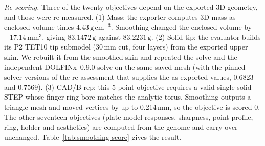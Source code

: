 \begin{table}[t]
\centering\small
\caption{Before and after smoothing, from the smoothing run's machine-readable record.}
\label{tab:smoothing}
\end{table}

\textit{Re-scoring.} Three of the twenty objectives depend on the exported 3D geometry, and those were re-measured. (1) Mass: the exporter computes 3D mass as enclosed volume times $4.43\,\mathrm{g\,cm^{-3}}$. Smoothing changed the enclosed volume by $-17.14\,\mathrm{mm^3}$, giving $83.1472\,\mathrm{g}$ against $83.2231\,\mathrm{g}$. (2) Solid tip: the evaluator builds its P2 TET10 tip submodel (30\,mm cut, four layers) from the exported upper skin. We rebuilt it from the smoothed skin and repeated the  solve and the independent DOLFINx~0.9.0 solve on the same saved mesh (with the pinned solver versions of the re-assessment that supplies the as-exported values, $0.6823$ and $0.7569$). (3) CAD/B-rep: this 5-point objective requires a valid single-solid STEP whose finger-ring bore matches the analytic torus. Smoothing outputs a triangle mesh and moved vertices by up to 0.214\,mm, so the objective is scored 0. The other seventeen objectives (plate-model responses, sharpness, point profile, ring, holder and aesthetics) are computed from the genome and carry over unchanged. Table~\ref{tab:smoothing-score} gives the result.

